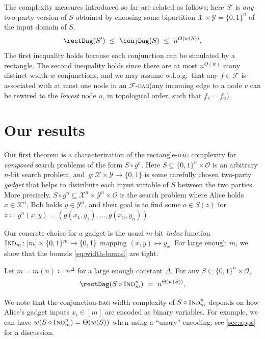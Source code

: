 \documentclass{toc}
\newcommand{\Ind}{\textsc{Ind}}
\newcommand{\DAGspace}{\textsc{dag}\xspace}
\newcommand{\calO}{\mathcal{O}}
\newcommand{\calF}{\mathcal{F}}
\newcommand{\calX}{\mathcal{X}}
\newcommand{\calY}{\mathcal{Y}}
\begin{document}
\bigskip\noindent
The complexity measures introduced so far are related as follows; here $S'$ is \emph{any} two-party version of $S$ obtained by choosing some bipartition $\calX\times\calY=\{0,1\}^n$ of the 
input domain of $S$. %
\begin{equation} \label{eq:width-bound}
\rectDag(S')~\leq~\conjDag(S)~\leq~n^{O(w(S))}.
\end{equation}
The first inequality holds because each conjunction can be simulated by a rectangle. The second inequality holds since there are at most $n^{O(w)}$ many distinct width-$w$ conjunctions, and we may assume w.l.o.g.\ that any $f\in\calF$ is associated with at most one node in an $\calF$-\DAGspace (any incoming edge to a node $v$ can be rewired to the \emph{lowest} node $u$, in topological order, such that $f_v=f_u$).

\section{Our results} \label{sec:results}

Our first theorem is a characterization of the rectangle-\DAGspace complexity for \emph{composed} search problems of the form $S\circ g^n$. Here $S\subseteq\{0,1\}^n\times\calO$ is an arbitrary $n$-bit search problem, and~$g\colon\calX\times\calY\to\{0,1\}$ is some carefully chosen two-party \emph{gadget} that helps to distribute each input variable of $S$ between the two parties. More precisely, $S\circ g^n\subseteq \calX^n\times\calY^n\times\calO$ is the search problem where Alice holds $x\in\calX^n$, Bob holds $y\in\calY^n$, and their goal is to find some $o\in S(z)$ for $z\coloneqq g^n(x,y)=(g(x_1,y_1),\ldots,g(x_n,y_n))$.

Our concrete choice for a gadget is the usual $m$-bit \emph{index} function $\Ind_m\colon[m]\times\{0,1\}^m\to\{0,1\}$ mapping $(x,y)\mapsto y_x$. For large enough $m$, we show that the bounds \eqref{eq:width-bound} are tight.
\begin{theorem} \label{thm:main}
Let $m=m(n)\coloneqq n^\Delta$ for a large enough constant $\Delta$. For any $S\subseteq\{0,1\}^n\times \calO$,
\[
\rectDag(S\circ \Ind_m^n)~=~
n^{\Theta(w(S))}.
\]
\end{theorem}
We note that the conjunction-\DAGspace width complexity of $S\circ\Ind_m^n$ depends on how Alice's gadget inputs $x_i\in [m]$ are encoded as binary variables. For example, we can have $w(S\circ\Ind_m^n)=\Theta(w(S))$ when using a ``unary'' encoding; see \autoref{sec:apps} for a discussion. 
\end{document}
